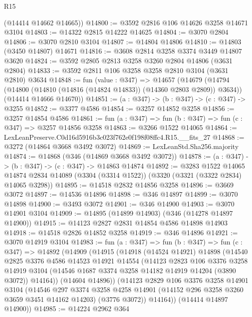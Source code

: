 \begin{lexlean}{R15}
\begin{coremodule}
      (@14414 @14662 @14665))
@14800 := @3592 @2816 @106 @14626 @3258 @14671 @3104
@14803 := @14322 @2815 @14222 @14625
@14804 := @3070 @2804
@14806 := @3070 @2810 @3104
@14807 := @14804 @14806
@14810 := @14803 (@3450 @14807) @14671
@14816 := @3608 @2814 @3258 @3374 @3449 @14807 @3620
@14824 := @3592 @2805 @2813 @3258 @3260 @2804 @14806 (@3631 @2804)
@14833 := @3592 @2811 @106 @3258 @3258 @2810 @3104 (@3631 @2810) @3634
@14848 := fun (value : @347) =>
  @14657
    (@14679
      (@14794 (@14800 (@14810 (@14816 (@14824 @14833)) (@14360 @2803 @2809)) @3634))
      (@14414 @14666 @14670))
@14851 := (a : @347) -> (b : @347) -> (c : @347) -> @3255
@14852 := @3377 @4586
@14854 := @3257 @14852 @3258
@14856 := @3257 @14854 @4586
@14861 := fun (a : @347) => fun (b : @347) => fun (c : @347) => @3257 @14856 @3258
@14863 := @3266 @1522 @14065
@14864 := LexLeanPreserve.C0d16d5916b3c023f762e0f198f08ffc4.R15.__fits_27
@14868 := @3272 (@14864 @3668 @3492 @3072)
@14869 := LexLeanStd.Sha256.majority
@14874 := @14868 (@346 (@14869 @3668 @3492 @3072))
@14878 := (a : @347) -> (b : @347) -> (c : @347) -> @14863 @14874
@14892 := @3283
    @1522
    @14065
    @14874
    @2834
    @14089
    (@3304 (@3314 @1522))
    (@3320 (@3321 (@3322 @2834) @14065 @3298))
@14895 := @14518 @2832 @14856 @3258
@14896 := @3669 @3072
@14897 := @14536 @14896
@14898 := @346 @14897
@14899 := @3070 @14898
@14900 := @3493 @3072
@14901 := @346 @14900
@14903 := @3070 @14901 @3104
@14909 := @14895 (@14899 @14903) (@346 (@14278 @14897 @14900))
@14915 := @14123 @2827 @2831 @14854 @4586 @14898 @14903
@14918 := @14518 @2826 @14852 @3258
@14919 := @346 @14896
@14921 := @3070 @14919 @3104
@14983 := fun (a : @347) =>
  fun (b : @347) =>
  fun (c : @347) =>
  @14892
    (@14909
      (@14915
        (@14918
          (@14524 @14921)
          @14898
          (@14540
            @2825
            @3376
            @4586
            @14523
            @14921
            @14554
            (@14123
              @2823
              @106
              @3376
              @3258
              @14919
              @3104
              (@14546 @1687 @3374 @3258 @14182 @14919 @14204 (@3890 @3072))
              @14164))
          (@14604 @14896))
        (@14123
          @2829
          @106
          @3376
          @3258
          @14901
          @3104
          (@14546
            @297
            @3374
            @3258
            @4258
            @14901
            (@14152 @296 @3258 @3260 @3659 @3451 @14162 @14203)
            (@3776 @3072))
          @14164))
      (@14414 @14897 @14900))
@14985 := @14224 @2962 @364

\end{coremodule}
\end{lexlean}
